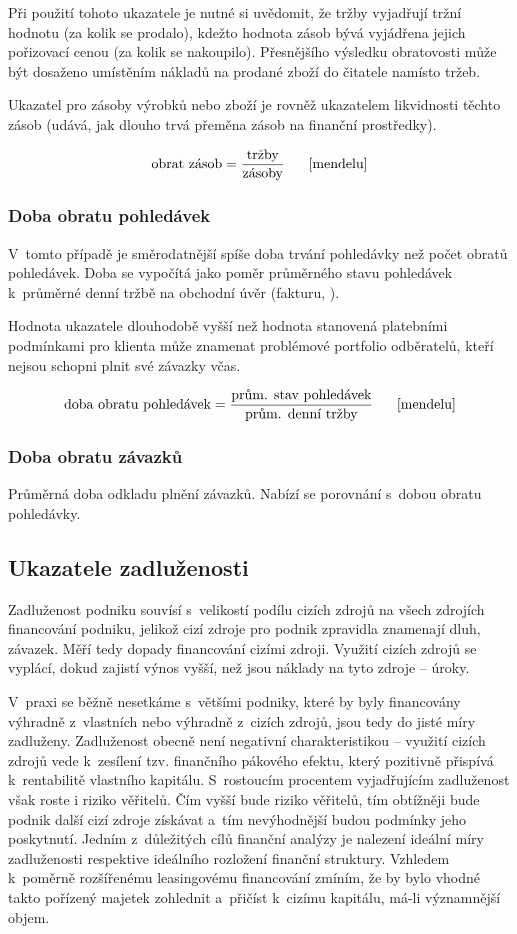 Při použití tohoto ukazatele je nutné si uvědomit, že tržby vyjadřují tržní hodnotu (za kolik se prodalo), kdežto hodnota zásob bývá vyjádřena jejich pořizovací cenou (za kolik se nakoupilo). Přesnějšího výsledku obratovosti může být dosaženo umístěním nákladů na prodané zboží do čitatele namísto tržeb.

Ukazatel pro zásoby výrobků nebo zboží je rovněž ukazatelem likvidnosti těchto zásob (udává, jak dlouho trvá přeměna zásob na finanční prostředky).

$$\vz{obrat zásob}{tržby}{zásoby} \scite{mendelu}$$


\subsubsection{Doba obratu pohledávek}
V~tomto případě je směrodatnější spíše doba trvání pohledávky než počet obratů pohledávek. Doba se vypočítá jako poměr průměrného stavu pohledávek k~průměrné denní tržbě na obchodní úvěr (fakturu, ).

Hodnota ukazatele dlouhodobě vyšší než hodnota stanovená platebními podmínkami pro klienta může znamenat problémové portfolio odběratelů, kteří nejsou schopni plnit své závazky včas.

$$\vz{doba obratu pohledávek}{prům. stav pohledávek}{prům. denní tržby} \scite{mendelu}$$

\subsubsection{Doba obratu závazků}
Průměrná doba odkladu plnění závazků. Nabízí se porovnání s~dobou obratu pohledávky. 





\subsection{Ukazatele zadluženosti}

Zadluženost podniku souvísí s~velikostí podílu cizích zdrojů na všech zdrojích financování podniku, jelikož cizí zdroje pro podnik zpravidla znamenají dluh, závazek. Měří tedy dopady financování cizími zdroji. Využití cizích zdrojů se vyplácí, dokud zajistí výnos vyšší, než jsou náklady na tyto zdroje -- úroky.

V~praxi se běžně nesetkáme s~většími podniky, které by byly financovány výhradně z~vlastních nebo výhradně z~cizích zdrojů, jsou tedy do jisté míry zadluženy. Zadluženost obecně není negativní charakteristikou -- využití cizích zdrojů vede k~zesílení tzv. finančního pákového efektu, který pozitivně přispívá k~rentabilitě vlastního kapitálu.\cite{kisling} S~rostoucím procentem vyjadřujícím zadluženost však roste i riziko věřitelů. Čím vyšší bude riziko věřitelů, tím obtížněji bude podnik další cizí zdroje získávat a~tím nevýhodnější budou podmínky jeho poskytnutí.\cite{mendelu} Jedním z~důležitých cílů finanční analýzy je nalezení ideální míry zadluženosti respektive ideálního rozložení finanční struktury. Vzhledem k~poměrně rozšířenému leasingovému financování zmíním, že by bylo vhodné takto pořízený majetek zohlednit a~přičíst k~cizímu kapitálu, má-li významnější objem.

